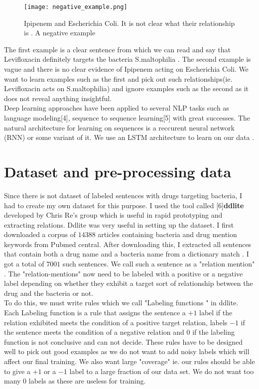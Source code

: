 \documentclass{article} %
\begin{document}
\begin{figure}[h]
\begin{center}
\texttt{[image: negative\_example.png]}
\end{center}
\caption{Ipipenem and Escherichia Coli. It is not clear what their relationship is . A negative example}
\end{figure}

The first example is a clear sentence from which we can read and say that Levifloxacin definitely targets the bacteria S.maltophilia . The second example is vague and there is no clear evidence of Ipipenem acting on Escherichia Coli. We want to learn examples such as the first and pick out such relationships(ie. Levifloxacin acts on S.maltophilia) and ignore examples such as the second as it does not reveal anything insightful. \\
Deep learning approaches have been applied to several NLP tasks such as language modeling[4], sequence to sequence learning[5] with great successes. The natural architecture for learning on sequences is a reccurent neural network (RNN) or some variant of it. We use an LSTM architecture to learn on our data .

\section{Dataset and pre-processing data}
Since there is not dataset of labeled sentences with drugs targeting bacteria, I had to create my own dataset for this purpose. I used the tool called [6]\textbf{ddlite} developed by Chris Re's group which is useful in rapid prototyping and extracting relations. Ddlite was very useful in setting up the dataset. I first downloaded a corpus of $14388$ articles containing bacteria and drug mention keywords from Pubmed central.
After downloading this, I extracted all sentences that contain both a drug name and a bacteria name from a dictionary match . I got a total of $7001$ such sentences. We call such a sentence as a "relation mention" . The "relation-mentions" now need to be labeled with a positive or a negative label depending on whether they exhibit a target sort of relationship between the drug and the bacteria or not.\\
To do this, we must write rules which we call "Labeling functions " in ddlite. Each Labeling function is a rule that assigns the sentence a $+1$ label if the relation exhibited meets the condition of a positive target relation, labels $-1$ if the sentence meets the condition of a negative relation and $0$ if the labeling function is not conclusive and can not decide. These rules have to be designed well to pick out good examples as we do not want to add noisy labels which will affect our final training. We also want large "coverage" ie. our rules should be able to give a $+1$ or a $-1$  label to a large fraction of our data set. We do not want too many $0$ labels as these are useless for training. \\
\end{document}
